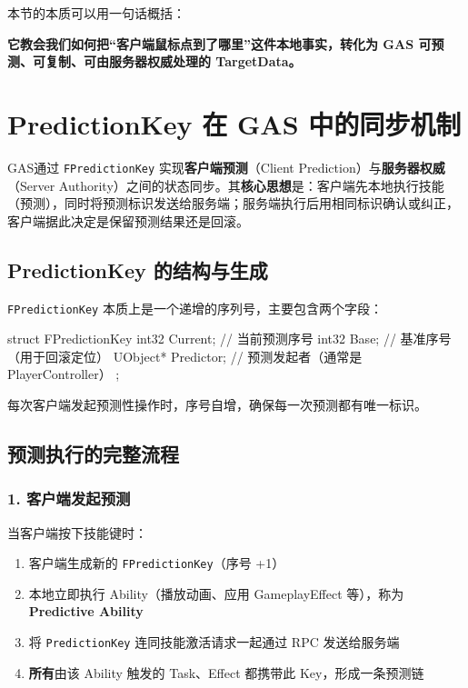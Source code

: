 \documentclass[10pt,CJKmath]{ctexart}
\begin{document}
本节的本质可以用一句话概括：

\begin{center}
	\textbf{它教会我们如何把“客户端鼠标点到了哪里”这件本地事实，转化为 GAS 可预测、可复制、可由服务器权威处理的 TargetData。}
\end{center}

\section{PredictionKey 在 GAS 中的同步机制}

GAS通过 \texttt{FPredictionKey} 实现\textbf{客户端预测}（Client Prediction）与\textbf{服务器权威}（Server Authority）之间的状态同步。其\textbf{核心思想}是：客户端先本地执行技能（预测），同时将预测标识发送给服务端；服务端执行后用相同标识确认或纠正，客户端据此决定是保留预测结果还是回滚。

\subsection{PredictionKey 的结构与生成}

\texttt{FPredictionKey} 本质上是一个递增的序列号，主要包含两个字段：

\begin{code}
struct FPredictionKey
{
	int32 Current;      // 当前预测序号
	int32 Base;         // 基准序号（用于回滚定位）
	UObject* Predictor; // 预测发起者（通常是 PlayerController）
};
\end{code}

每次客户端发起预测性操作时，序号自增，确保每一次预测都有唯一标识。

\subsection{预测执行的完整流程}

\subsubsection{1. 客户端发起预测}

当客户端按下技能键时：

\begin{enumerate}
	\item 客户端生成新的 \texttt{FPredictionKey}（序号 +1）
	\item 本地立即执行 Ability（播放动画、应用 GameplayEffect 等），称为 \textbf{Predictive Ability}
	\item 将 \texttt{PredictionKey} 连同技能激活请求一起通过 RPC 发送给服务端
	\item \textbf{所有}由该 Ability 触发的 Task、Effect 都携带此 Key，形成一条预测链
\end{enumerate}
\end{document}
